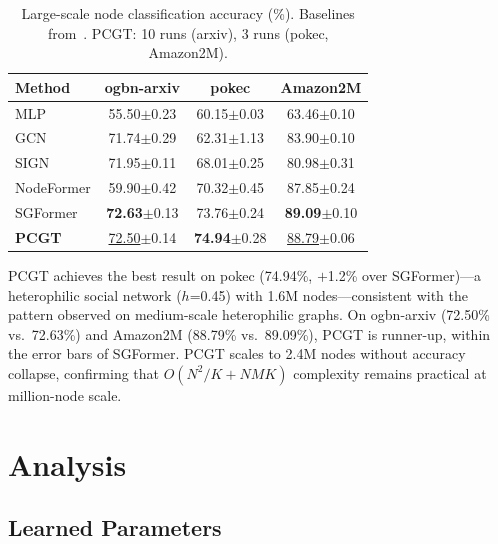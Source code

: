 \documentclass[manuscript, screen, review, anonymous]{acmart}
\newcommand{\best}[1]{\textcolor{bestcolor}{\textbf{#1}}}
\newcommand{\runup}[1]{\textcolor{runnerup}{\underline{#1}}}
\begin{document}
\begin{table}[t]
\caption{Large-scale node classification accuracy (\%). Baselines from~\citet{wu2023sgformer}. PCGT: 10 runs (arxiv), 3 runs (pokec, Amazon2M).}
\label{tab:largescale}
\centering
\small
\begin{tabular}{l|ccc}
\toprule
\textbf{Method} & \textbf{ogbn-arxiv} & \textbf{pokec} & \textbf{Amazon2M} \\
\midrule
MLP & 55.50{\scriptsize$\pm$0.23} & 60.15{\scriptsize$\pm$0.03} & 63.46{\scriptsize$\pm$0.10} \\
GCN & 71.74{\scriptsize$\pm$0.29} & 62.31{\scriptsize$\pm$1.13} & 83.90{\scriptsize$\pm$0.10} \\
SIGN & 71.95{\scriptsize$\pm$0.11} & 68.01{\scriptsize$\pm$0.25} & 80.98{\scriptsize$\pm$0.31} \\
NodeFormer & 59.90{\scriptsize$\pm$0.42} & 70.32{\scriptsize$\pm$0.45} & 87.85{\scriptsize$\pm$0.24} \\
SGFormer & \best{72.63}{\scriptsize$\pm$0.13} & 73.76{\scriptsize$\pm$0.24} & \best{89.09}{\scriptsize$\pm$0.10} \\
\midrule
\textbf{PCGT} & \runup{72.50}{\scriptsize$\pm$0.14} & \best{74.94}{\scriptsize$\pm$0.28} & \runup{88.79}{\scriptsize$\pm$0.06} \\
\bottomrule
\end{tabular}
\end{table}

PCGT achieves the best result on pokec (74.94\%, $+$1.2\% over SGFormer)---a heterophilic social network ($h$=0.45) with 1.6M nodes---consistent with the pattern observed on medium-scale heterophilic graphs. On ogbn-arxiv (72.50\% vs.\ 72.63\%) and Amazon2M (88.79\% vs.\ 89.09\%), PCGT is runner-up, within the error bars of SGFormer. PCGT scales to 2.4M nodes without accuracy collapse, confirming that $O(N^2/K + NMK)$ complexity remains practical at million-node scale.


\section{Analysis}
\label{sec:analysis}

\subsection{Learned Parameters}
\end{document}

